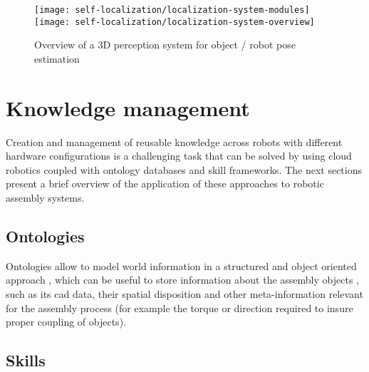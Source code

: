 \begin{figure}[H]
	\centering
	\texttt{[image: self-localization/localization-system-modules]}
	\texttt{[image: self-localization/localization-system-overview]}
	\caption[Overview of a 3D perception system for object / robot pose estimation]{Overview of a 3D perception system for object / robot pose estimation \cite{Costa2016Elsevier}}
	\label{fig:localization-system}
\end{figure}



\section{Knowledge management}

Creation and management of reusable knowledge across robots with different hardware configurations is a challenging task that can be solved by using cloud robotics coupled with ontology databases and skill frameworks. The next sections present a brief overview of the application of these approaches to robotic assembly systems.


\subsection{Ontologies}

Ontologies allow to model world information in a structured and object oriented approach \cite{Lemaignan2012,Stenmark2015}, which can be useful to store information about the assembly objects \cite{Perzylo2015}, such as its \gls{cad} data, their spatial disposition and other meta-information relevant for the assembly process (for example the torque or direction required to insure proper coupling of objects).



\subsection{Skills}

